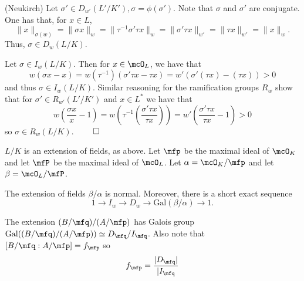 \documentclass[a4paper, 12pt,oneside,openany]{book}
\begin{document}

 (Neukirch) Let $\sigma' \in D_{w'}(L'/K'), \sigma = \phi(\sigma')$. Note that $\sigma$ and $\sigma'$ are conjugate. One has that, for $x \in L$, $$\|x\|_{\sigma(w)} = \|\sigma x \|_w = \| \tau^{-1} \sigma' \tau x \|_w = \| \sigma' \tau x \|_{w'} = \| \tau x \|_{w'} = \|x \|_w.$$ Thus, $\sigma \in D_w(L/K).$

Let $\sigma \in I_w(L/K)$. Then for $x \in \mcO_L$, we have that $$w(\sigma x-x) = w(\tau^{-1})(\sigma' \tau x - \tau x) = w'(\sigma'(\tau x)-(\tau x)) > 0 $$ and thus $\sigma \in I_w(L/K).$ Similar reasoning for the ramification groups $R_w$ show that for $\sigma' \in R_{w'}(L'/K')$ and $x \in L^*$ we have that $$w\left(\frac{\sigma x}{x}-1\right) = w\left(\tau^{-1}\left(\frac{\sigma' \tau x}{\tau x}\right)\right) = w'\left(\frac{\sigma'\tau x}{\tau x}-1\right) > 0 $$ so $\sigma \in R_w(L/K)$. $\qed$

$L/K$ is an extension of fields, as above. Let $\mfp$ be the maximal ideal of $\mcO_K$ and let $\mfP$ be the maximal ideal of $\mcO_L$. Let $\alpha=\mcO_K/\mfp$ and let $\beta = \mcO_L / \mfP$.
	
The extension of fields $\beta/\alpha$ is normal. Moreover, there is a short exact sequence $$1 \to I_w \to D_w \to \text{Gal}(\beta/\alpha) \to 1.$$


The extension $(B/\mfq)/(A/\mfp)$ has Galois group $\text{Gal}((B/\mfq)/(A/\mfp)) \simeq D_\mfq / I_\mfq$. Also note that $[B/\mfq:A/\mfp]=f_\mfp$ so $$f_\mfp = \frac{|D_\mfq|}{|I_\mfq}$$
\end{document}
